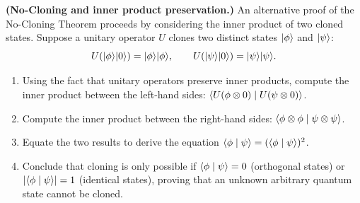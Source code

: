 \begin{exercise}\label{ch42:ex-no-cloning-overlap}
\textbf{(No-Cloning and inner product preservation.)}
An alternative proof of the No-Cloning Theorem proceeds by considering the inner product of two cloned states.
Suppose a unitary operator $U$ clones two distinct states $\lvert \phi \rangle$ and $\lvert \psi \rangle$:
\[
  U(\lvert \phi \rangle\lvert 0 \rangle) = \lvert \phi \rangle\lvert \phi \rangle, \qquad U(\lvert \psi \rangle\lvert 0 \rangle) = \lvert \psi \rangle\lvert \psi \rangle.
\]
\begin{enumerate}
  \item Using the fact that unitary operators preserve inner products, compute the inner product between the left-hand sides:
  $\langle U(\phi\otimes 0) \mid U(\psi\otimes 0) \rangle$.
  \item Compute the inner product between the right-hand sides:
  $\langle \phi\otimes\phi \mid \psi\otimes\psi \rangle$.
  \item Equate the two results to derive the equation $\langle \phi \mid \psi \rangle = (\langle \phi \mid \psi \rangle)^2$.
  \item Conclude that cloning is only possible if $\langle \phi \mid \psi \rangle = 0$ (orthogonal states) or $\lvert\langle \phi \mid \psi \rangle\rvert = 1$ (identical states), proving that an unknown arbitrary quantum state cannot be cloned.
\end{enumerate}
\end{exercise}
